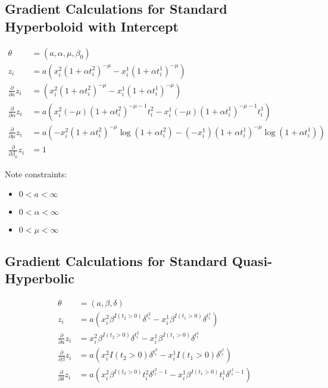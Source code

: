 \documentclass[12pt]{article}
\begin{document}
\subsection{Gradient Calculations for Standard Hyperboloid with Intercept}

\begin{align*}
\theta &= (a, \alpha, \mu, \beta_0) \\
z_i &= a (x^2_i (1 + \alpha t^2_i)^{-\mu} - x^1_i (1 + \alpha t^1_i)^{-\mu}) \\
\frac{\partial}{\partial a} z_i
  &= (x^2_i (1 + \alpha t^2_i)^{-\mu} - x^1_i (1 + \alpha t^1_i)^{-\mu}) \\
\frac{\partial}{\partial \alpha} z_i
  &= a (
    x^2_i (-\mu) (1 + \alpha t^2_i)^{-\mu - 1} t^2_i
    - x^1_i (-\mu) (1 + \alpha t^1_i)^{-\mu - 1} t^1_i
  ) \\
\frac{\partial}{\partial \mu} z_i
  &= a (
    -x^2_i (1 + \alpha t^2_i)^{-\mu} \log(1 + \alpha t^2_i)
    - (-x^1_i) (1 + \alpha t^1_i)^{-\mu} \log(1 + \alpha t^1_i)
  ) \\
\frac{\partial}{\partial \beta_0} z_i
  &= 1
\end{align*}

Note constraints:

\begin{itemize}
    \item{$0 < a < \infty$}
    \item{$0 < \alpha < \infty$}
    \item{$0 < \mu < \infty$}
\end{itemize}

\subsection{Gradient Calculations for Standard Quasi-Hyperbolic}

\begin{align*}
\theta &= (a, \beta, \delta) \\
z_i &= a (
  x^2_i \beta^{I(t_2 > 0)} \delta^{t^2_i}
  - x^1_i \beta^{I(t_1 > 0)} \delta^{t^1_i}
) \\
\frac{\partial}{\partial a} z_i
  &= x^2_i \beta^{I(t_2 > 0)} \delta^{t^2_i}
  - x^1_i \beta^{I(t_1 > 0)} \delta^{t^1_i} \\
\frac{\partial}{\partial \beta} z_i
  &= a (x^2_i I(t_2 > 0) \delta^{t^2_i} - x^1_i I(t_1 > 0) \delta^{t^1_i}) \\
\frac{\partial}{\partial \delta} z_i
  &= a (
    x^2_i \beta^{I(t_2 > 0)} t^2_i \delta^{t^2_i - 1}
    - x^1_i \beta^{I(t_1 > 0)} t^1_i \delta^{t^1_i - 1}
  ) \\
\end{align*}
\end{document}
